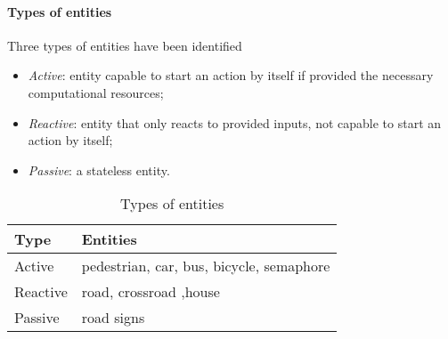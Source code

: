 \paragraph{Types of entities}
Three types of entities have been identified
\begin{itemize}
  \item \textit{Active}: entity capable to start an action by itself if provided 
the necessary computational resources;
  \item \textit{Reactive}: entity that only reacts to provided inputs, 
not capable to start an action by itself;
  \item \textit{Passive}: a stateless entity.
\end{itemize}
\begin{table}[H]
\centering
\begin{tabular}{|l|l|}
\hline
\rowcolor{BlueGreen}
Type     & Entities                                 \\ \hline
Active   & pedestrian, car, bus, bicycle, semaphore \\ \hline
Reactive & road, crossroad ,house                   \\ \hline
Passive  & road signs                               \\ \hline
\end{tabular}
\caption{Types of entities}
\label{tab:entity_type}
\end{table}

